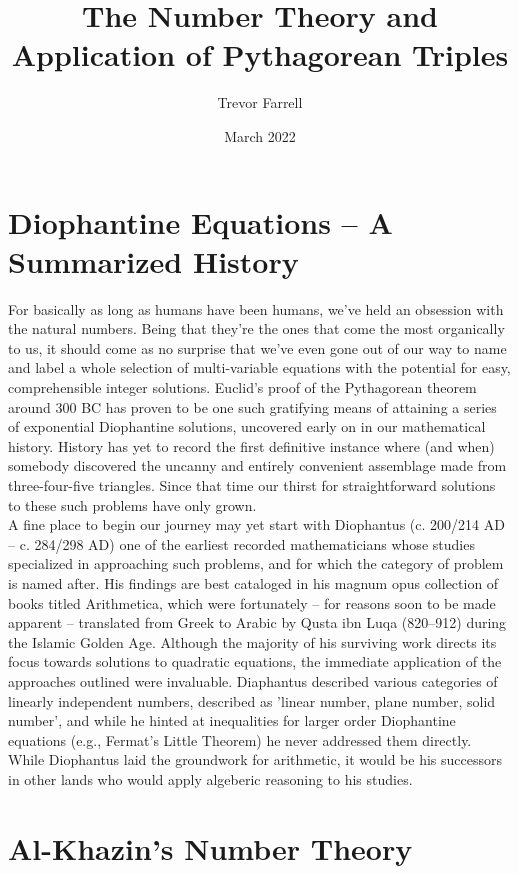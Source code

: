 \documentclass{article}
\title{The Number Theory and Application of Pythagorean Triples}
\author{Trevor Farrell}
\date{March 2022}
\begin{document}
\maketitle

\section{Diophantine Equations – A Summarized History}

For basically as long as humans have been humans, we’ve held an obsession with the natural numbers. Being that they’re the ones that come the most organically to us, it should come as no surprise that we’ve even gone out of our way to name and label a whole selection of multi-variable equations with the potential for easy, comprehensible integer solutions. Euclid’s proof of the Pythagorean theorem around 300 BC \cite{historyofmathematics} has proven to be one such gratifying means of attaining a series of exponential Diophantine solutions, uncovered early on in our mathematical history. History has yet to record the first definitive instance where (and when) somebody discovered the uncanny and entirely convenient assemblage made from three-four-five triangles. Since that time our thirst for straightforward solutions to these such problems have only grown. \\

A fine place to begin our journey may yet start with Diophantus (c. 200/214 AD – c. 284/298 AD) one of the earliest recorded mathematicians whose studies specialized in approaching such problems, and for which the category of problem is named after. His findings are best cataloged in his magnum opus collection of books titled Arithmetica, which were fortunately -- for reasons soon to be made apparent -- translated from Greek to Arabic by Qusta ibn Luqa (820–912) during the Islamic Golden Age. Although the majority of his surviving work directs its focus towards solutions to quadratic equations, the immediate application of the approaches outlined were invaluable. Diaphantus described various categories of linearly independent numbers, described as 'linear number, plane number, solid number', and while he hinted at inequalities for larger order Diophantine equations (e.g., Fermat's Little Theorem) he never addressed them directly. While Diophantus laid the groundwork for arithmetic, it would be his successors in other lands who would apply algeberic reasoning to his studies.  \\

\section{Al-Khazin's Number Theory}
\end{document}

